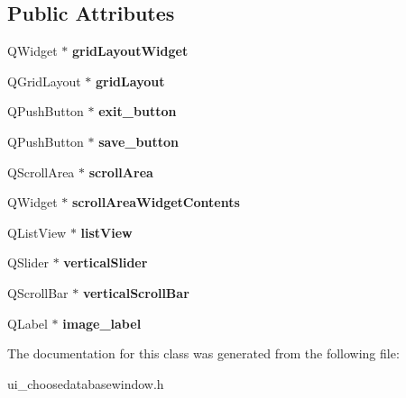\subsection*{Public Attributes}
\begin{DoxyCompactItemize}
\item 
\mbox{\label{class_ui___choose_database_window_a6e6c277700117e6398586d2a5649e36c}} 
Q\+Widget $\ast$ {\bfseries grid\+Layout\+Widget}
\item 
\mbox{\label{class_ui___choose_database_window_ac90ea77e8a617a76bb7fab6959489b7c}} 
Q\+Grid\+Layout $\ast$ {\bfseries grid\+Layout}
\item 
\mbox{\label{class_ui___choose_database_window_ac987b0a090ee4e8cd28df3d35e81a646}} 
Q\+Push\+Button $\ast$ {\bfseries exit\+\_\+button}
\item 
\mbox{\label{class_ui___choose_database_window_a3e74e982c89730bd9f8c722ce7c89f0d}} 
Q\+Push\+Button $\ast$ {\bfseries save\+\_\+button}
\item 
\mbox{\label{class_ui___choose_database_window_a3738b8edeae045577cffd76af84d4d48}} 
Q\+Scroll\+Area $\ast$ {\bfseries scroll\+Area}
\item 
\mbox{\label{class_ui___choose_database_window_ac800d1c4c43bc2d9fa6d78d748d9d08a}} 
Q\+Widget $\ast$ {\bfseries scroll\+Area\+Widget\+Contents}
\item 
\mbox{\label{class_ui___choose_database_window_a948771d06f7c81857279cf06d27bd571}} 
Q\+List\+View $\ast$ {\bfseries list\+View}
\item 
\mbox{\label{class_ui___choose_database_window_ad4570e7601f2f3826f9b80415a913d40}} 
Q\+Slider $\ast$ {\bfseries vertical\+Slider}
\item 
\mbox{\label{class_ui___choose_database_window_ab05ca5555ee78080d494531311e22d4f}} 
Q\+Scroll\+Bar $\ast$ {\bfseries vertical\+Scroll\+Bar}
\item 
\mbox{\label{class_ui___choose_database_window_a42454f18842284f769d3c70f38f04a74}} 
Q\+Label $\ast$ {\bfseries image\+\_\+label}
\end{DoxyCompactItemize}


The documentation for this class was generated from the following file\+:\begin{DoxyCompactItemize}
\item 
ui\+\_\+choosedatabasewindow.\+h\end{DoxyCompactItemize}
